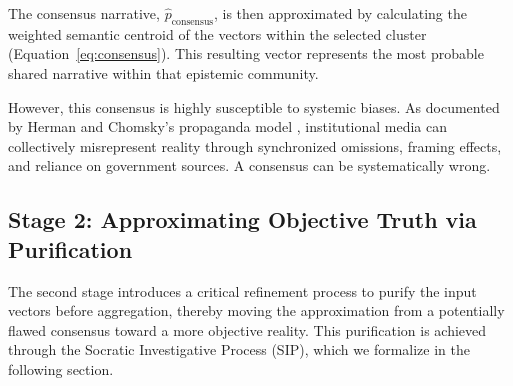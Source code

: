 \documentclass[11pt,a4paper]{article}
\begin{document}
\begin{small}
The consensus narrative, $\hat{p}_{\text{consensus}}$, is then approximated by calculating the weighted semantic centroid of the vectors within the selected cluster (Equation~\ref{eq:consensus}). This resulting vector represents the most probable shared narrative within that epistemic community.

However, this consensus is highly susceptible to systemic biases. As documented by Herman and Chomsky's propaganda model \citep{Herman1988}, institutional media can collectively misrepresent reality through synchronized omissions, framing effects, and reliance on government sources. A consensus can be systematically wrong.

\subsection{Stage 2: Approximating Objective Truth via Purification}

The second stage introduces a critical refinement process to purify the input vectors before aggregation, thereby moving the approximation from a potentially flawed consensus toward a more objective reality. This purification is achieved through the Socratic Investigative Process (SIP), which we formalize in the following section.

\begin{figure}[ht]
\centering
{}
\end{figure}
\end{small}
\end{document}
